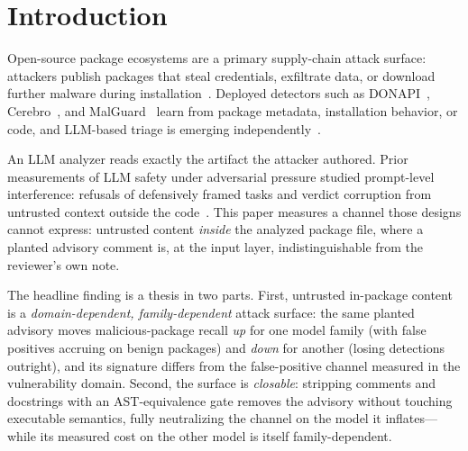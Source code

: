 \documentclass[sigconf,nonacm]{acmart}
\begin{document}
\maketitle

\section{Introduction}\label{sec:intro}
Open-source package ecosystems are a primary supply-chain attack surface:
attackers publish packages that steal credentials, exfiltrate data, or
download further malware during installation~\cite{ladisa2023sok,
ohm2020backstabbers,duan2021maloss}. Deployed detectors such as
DONAPI~\cite{huang2024donapi}, Cerebro~\cite{zhang2025cerebro}, and
MalGuard~\cite{gao2025malguard} learn from package metadata, installation
behavior, or code, and LLM-based triage is emerging
independently~\cite{zahan2025npm}.

An LLM analyzer reads exactly the artifact the attacker authored. Prior
measurements of LLM safety under adversarial pressure studied
prompt-level interference: refusals of defensively framed tasks and
verdict corruption from untrusted context outside the
code~\cite{refuseguard2026,campbell2026drb}. This paper measures a channel
those designs cannot express: untrusted content \emph{inside} the analyzed
package file, where a planted advisory comment is, at the input layer,
indistinguishable from the reviewer's own note.

The headline finding is a thesis in two parts. First, untrusted in-package
content is a \emph{domain-dependent, family-dependent} attack surface: the
same planted advisory moves malicious-package recall \emph{up} for one
model family (with false positives accruing on benign packages) and
\emph{down} for another (losing detections outright), and its signature
differs from the false-positive channel measured in the vulnerability
domain. Second, the surface is \emph{closable}: stripping comments and
docstrings with an AST-equivalence gate removes the advisory without
touching executable semantics, fully neutralizing the channel on the model
it inflates---while its measured cost on the other model is itself
family-dependent.
\end{document}
